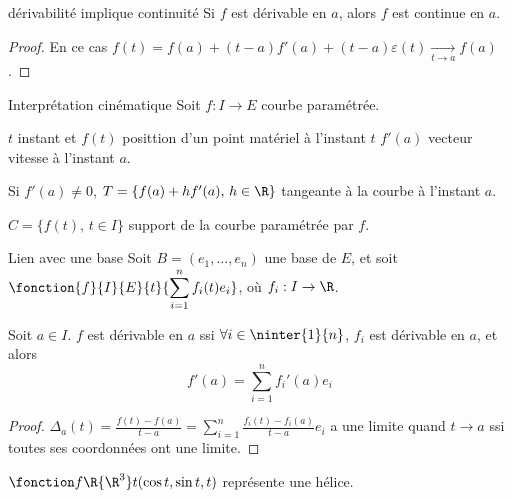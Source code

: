 \begin{corollaire}{dérivabilité implique continuité}{}
    Si $f$ est dérivable en $a$, alors $f$ est continue en $a$.
\end{corollaire}

\begin{proof}
    En ce cas $f(t) = f(a) + (t-a)f'(a) + (t-a)\varepsilon(t) \xrightarrow[t \to a]{} f(a)$.
\end{proof}


\begin{definition}{Interprétation cinématique}{}
    Soit $f : I \to E$ courbe paramétrée. 
    
    $t$ instant et $f(t)$ posittion d'un point matériel à l'instant 
    $t$ $f'(a)$ vecteur vitesse à l'instant $a$. 

    Si $f'(a) \neq 0$, $T = \{ f(a) + hf'(a), \, h \in \R\}$ tangeante à la courbe à l'instant 
    $a$. 

    $C = \{ f(t), \, t \in I\}$ support de la courbe paramétrée par $f$. 
\end{definition}

\begin{proposition}{Lien avec une base }{}
    Soit $B = (e_1, \ldots, e_n)$ une base de $E$, et soit 
    $\displaystyle \fonction{f}{I}{E}{t}{\sum_{i=1}^n f_i(t)e_i}$, où $f_i : I \to \R$.

    Soit $a \in I$. $f$ est dérivable en $a$ ssi $\forall i \in \ninter{1}{n}$, $f_i$
    est dérivable en $a$, et alors 
    $$f'(a) = \sum_{i=1}^n f_i'(a)e_i$$
\end{proposition}

\begin{proof}
    $\Delta_a(t) = \displaystyle \frac{f(t) - f(a)}{t-a} = \sum_{i=1}^n \frac{f_i(t) - f_i(a)}{t-a}e_i$ a 
    une limite quand $t \to a $ ssi toutes ses coordonnées ont une limite.
\end{proof}

\begin{exemple}
    $\fonction f \R {\R^3} t {(\cos t, \sin t, t)}$ représente une hélice.
\end{exemple}

